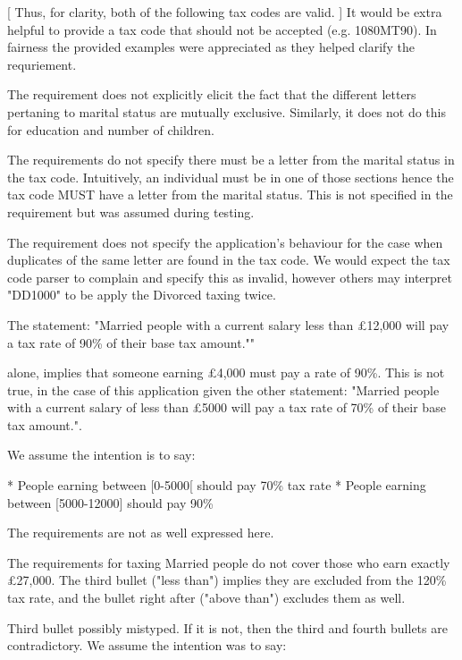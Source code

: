 [ Thus, for clarity, both of the following tax codes are valid. ] 
It would be extra helpful to provide a tax code that should not be accepted (e.g. 1080MT90). In fairness the provided examples were appreciated as they helped clarify the requriement.

The requirement does not explicitly elicit the fact that the different letters pertaning to marital status are mutually exclusive. Similarly, it does not do this for education and number of children. 

The requirements do not specify there must be a letter from the marital status in the tax code. Intuitively, an individual must be in one of those sections hence the tax code MUST have a letter from the marital status. This is not specified in the requirement but was assumed during testing. 

The requirement does not specify the application's behaviour for the case when duplicates of the same letter are found in the tax code. We would expect the tax code parser to complain and specify this as invalid, however others may interpret "DD1000" to be apply the Divorced taxing twice. 


The statement: "Married people with a current salary less than £12,000 will pay a tax rate of 90\% of their base tax amount.""

alone, implies that someone earning £4,000 must pay a rate of 90\%. This is not true, in the case of this application given the other statement: "Married people with a current salary of less than £5000 will pay a tax rate of 70\% of their base tax amount.". 

We assume the intention is to say: 

* People earning between [0-5000[ should pay 70\% tax rate 
* People earning between [5000-12000] should pay 90\%

The requirements are not as well expressed here. 

The requirements for taxing Married people do not cover those who earn exactly £27,000. The third bullet ("less than") implies they are excluded from the 120\% tax rate, and the bullet right after ("above than") excludes them as well. 

Third bullet possibly mistyped. If it is not, then the third and fourth bullets are contradictory. We assume the intention was to say:  

